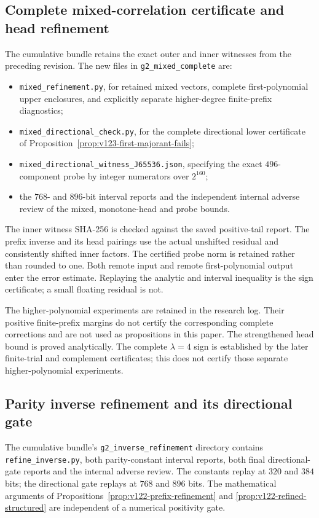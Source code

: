 \documentclass[11pt]{article}
\theoremstyle{remark}
\begin{document}
\subsection*{Complete mixed-correlation certificate and head refinement}
\label{app:v123-mixed}
The cumulative bundle retains the exact outer and inner witnesses
from the preceding revision. The new files in
\texttt{g2\_mixed\_complete} are:
\begin{itemize}[nosep]
\item \nolinkurl{mixed_refinement.py}, for retained mixed vectors,
complete first-polynomial upper enclosures, and explicitly separate
higher-degree finite-prefix diagnostics;
\item \nolinkurl{mixed_directional_check.py}, for the complete
directional lower certificate of
Proposition~\ref{prop:v123-first-majorant-fails};
\item \nolinkurl{mixed_directional_witness_J65536.json}, specifying
the exact $496$-component probe by integer numerators over $2^{160}$;
\item the $768$- and $896$-bit interval reports and the independent
internal adverse review of the mixed, monotone-head and probe bounds.
\end{itemize}
The inner witness SHA-256 is checked against the saved positive-tail
report. The prefix inverse and its head pairings use the actual
unshifted residual and consistently shifted inner factors. The
certified probe norm is retained rather than rounded to one.
Both remote input and remote first-polynomial output enter the
error estimate. Replaying the analytic and interval inequality is
the sign certificate; a small floating residual is not.

The higher-polynomial experiments are retained in the research log.
Their positive finite-prefix margins do not certify the corresponding
complete corrections and are not used as propositions in this paper.
The strengthened head bound is proved analytically. The complete
$\lambda=4$ sign is established by the later finite-trial and
complement certificates; this does not certify those separate
higher-polynomial experiments.

\subsection*{Parity inverse refinement and its directional gate}
\label{app:v122-inverse}
The cumulative bundle's \texttt{g2\_inverse\_refinement} directory
contains \texttt{refine\_inverse.py}, both parity-constant interval
reports, both final directional-gate reports and the internal adverse
review. The constants replay at $320$ and $384$ bits; the directional
gate replays at $768$ and $896$ bits. The mathematical arguments of
Propositions~\ref{prop:v122-prefix-refinement} and
\ref{prop:v122-refined-structured} are independent of a numerical
positivity gate.
\end{document}
